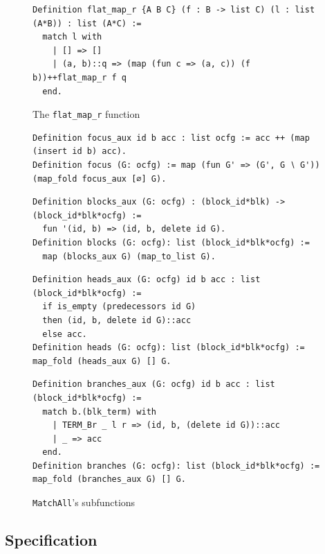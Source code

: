 \documentclass[11pt]{article}
\newcommand{\inlinecoq}[1]{\mbox{\lstinline[style=customcoq,columns=fixed,basewidth=.48em]{#1}}}
\newcommand{\ilc}[1]{\inlinecoq{#1}}
\begin{document}
\begin{figure}
  \begin{lstlisting}[style=customcoq,basicstyle=\small\ttfamily]
Definition flat_map_r {A B C} (f : B -> list C) (l : list (A*B)) : list (A*C) :=
  match l with
    | [] => []
    | (a, b)::q => (map (fun c => (a, c)) (f b))++flat_map_r f q
  end.
  \end{lstlisting}
  \caption{The \ilc{flat_map_r} function}
  \label{fig:flatmap}
\end{figure}
\begin{figure}
  \begin{lstlisting}[style=customcoq,basicstyle=\small\ttfamily]
Definition focus_aux id b acc : list ocfg := acc ++ (map (insert id b) acc).
Definition focus (G: ocfg) := map (fun G' => (G', G ∖ G')) (map_fold focus_aux [∅] G).
  \end{lstlisting}
  
  \begin{lstlisting}[style=customcoq,basicstyle=\small\ttfamily]
Definition blocks_aux (G: ocfg) : (block_id*blk) -> (block_id*blk*ocfg) :=
  fun '(id, b) => (id, b, delete id G).
Definition blocks (G: ocfg): list (block_id*blk*ocfg) :=
  map (blocks_aux G) (map_to_list G).
  \end{lstlisting}
  
  \begin{lstlisting}[style=customcoq,basicstyle=\small\ttfamily]
Definition heads_aux (G: ocfg) id b acc : list (block_id*blk*ocfg) :=
  if is_empty (predecessors id G)
  then (id, b, delete id G)::acc
  else acc.
Definition heads (G: ocfg): list (block_id*blk*ocfg) := map_fold (heads_aux G) [] G.
  \end{lstlisting}
  
  \begin{lstlisting}[style=customcoq,basicstyle=\small\ttfamily]
Definition branches_aux (G: ocfg) id b acc : list (block_id*blk*ocfg) :=
  match b.(blk_term) with
    | TERM_Br _ l r => (id, b, (delete id G))::acc
    | _ => acc
  end.
Definition branches (G: ocfg): list (block_id*blk*ocfg) := map_fold (branches_aux G) [] G.
  \end{lstlisting}
  \caption{\ilc{MatchAll}'s subfunctions}
  \label{fig:match_sub_funs}
\end{figure}

\subsection{Specification}
\end{document}
